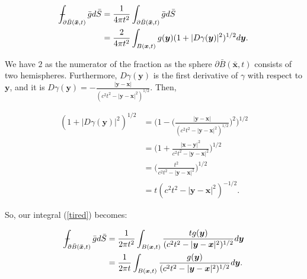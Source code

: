 \documentclass[a4paper, 12pt]{article}
\def\Xint#1{\mathchoice
{\XXint\displaystyle\textstyle{#1}}%
{\XXint\textstyle\scriptstyle{#1}}%
{\XXint\scriptstyle\scriptscriptstyle{#1}}%
{\XXint\scriptscriptstyle\scriptscriptstyle{#1}}%
\!\int}
\def\XXint#1#2#3{{\setbox0=\hbox{$#1{#2#3}{\int}$ }
\vcenter{\hbox{$#2#3$ }}\kern-.6\wd0}}
\def\dashint{\Xint-}
\numberwithin{equation}{section}
\begin{document}
\begin{equation} \label{tired}
    \begin{aligned}
        \dashint_{\partial \bar{B}(\boldsymbol{\bar{x}}, t)} \bar{g} d\bar{S}&=\frac{1}{4\pi t^2}\int_{\partial \bar{B}(\boldsymbol{\bar{x}}, t)}\bar{g} d\bar{S}\\
        &=\frac{2}{4 \pi t^2} \int_{B(\boldsymbol{x}, t)} g(\boldsymbol{y})(1+|D\gamma (\boldsymbol{y})|^2)^{1/2}d\boldsymbol{y}.
    \end{aligned}
\end{equation}

We have $2$ as the numerator of the fraction as the sphere
$\partial\bar{B}(\boldsymbol{\bar{x}}, t)$ consists of two hemispheres.
Furthermore, $D\gamma (\boldsymbol{y})$ is the first derivative of $\gamma$ with
respect to $\boldsymbol{y}$, and it is $D\gamma
(\boldsymbol{y})=-\frac{|\boldsymbol{y}-\boldsymbol{x}|}{(c^2
t^2-|\boldsymbol{y}-\boldsymbol{x}|^2)^{1/2}}$. Then,

\begin{equation*}
    \begin{aligned}
        (1+|D\gamma (\boldsymbol{y})|^2)^{1/2}&=\Big(1-\Big(\frac{|\boldsymbol{y}-\boldsymbol{x}|}{(c^2 t^2-|\boldsymbol{y}-\boldsymbol{x}|^2)^{1/2}}\Big)^2\Big)^{1/2}\\
        &=\Big(1+\frac{|\boldsymbol{x}-\boldsymbol{y}|^2}{c^2 t^2-|\boldsymbol{y}-\boldsymbol{x}|^2}\Big)^{1/2}\\
        &=\Big(\frac{t^2}{c^2 t^2-|\boldsymbol{y}-\boldsymbol{x}|^2}\Big)^{1/2}\\
        &=t(c^2 t^2-|\boldsymbol{y}-\boldsymbol{x}|^2)^{-1/2}.
    \end{aligned}
\end{equation*}

So, our integral (\ref{tired}) becomes:

\begin{equation*}
    \begin{aligned}
        \dashint_{\partial \bar{B}(\boldsymbol{\bar{x}}, t)} \bar{g} d\bar{S}&=\frac{1}{2 \pi t^2}\int_{B(\boldsymbol{x},t)}\frac{tg(\boldsymbol{y})}{(c^2 t^2-|\boldsymbol{y}-\boldsymbol{x}|^2)^{1/2}}d\boldsymbol{y}\\
        &=\frac{1}{2 \pi t}\int_{B(\boldsymbol{x},t)}\frac{g(\boldsymbol{y})}{(c^2 t^2-|\boldsymbol{y}-\boldsymbol{x}|^2)^{1/2}}d\boldsymbol{y}.
    \end{aligned}
\end{equation*}
\end{document}
